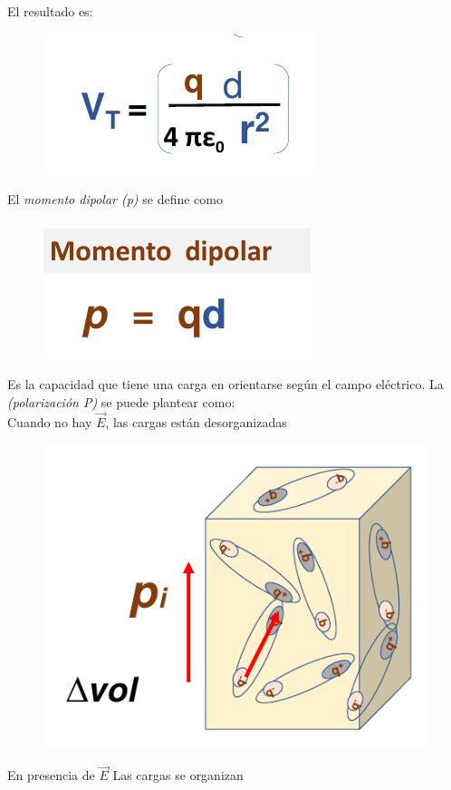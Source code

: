 \documentclass[12pt,letterpaper]{book}
\begin{document}
El resultado es:


\begin{figure}[H]
\centering
\includegraphics[width=.5\linewidth]{figures/pol2.png}
\caption{}
\label{pol2}
\end{figure}
\vspace{0.2cm}


El \textit{momento dipolar (p) } se define como

\begin{figure}[H]
\centering
\includegraphics[width=.5\linewidth]{figures/pol3.png}
\caption{}
\label{pol3}
\end{figure}
\vspace{0.2cm}

Es la capacidad que tiene una carga en orientarse según el campo eléctrico. La \textit{(polarización P)} se puede plantear como:\\

Cuando no hay $\vec{E}$, las cargas están desorganizadas 
\begin{figure}[H]
\centering
\includegraphics[width=.5\linewidth]{figures/pol5.png}
\caption{}
\label{pol5}
\end{figure}
\vspace{0.2cm}

En presencia de $\vec{E}$ Las cargas se organizan
\end{document}
